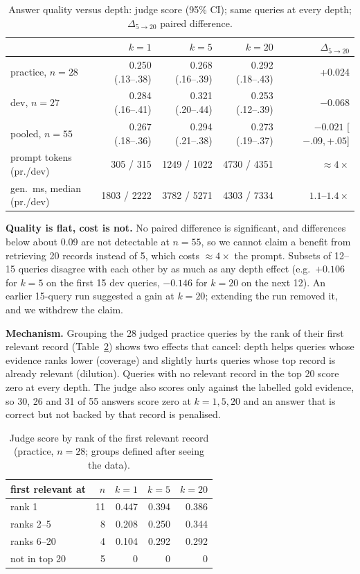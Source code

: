 \documentclass{article}
\begin{document}
\begin{table}[h]
\centering\footnotesize
\caption{Answer quality versus depth: judge score (95\% CI); same queries at every depth; $\Delta_{5\to20}$ paired difference.}
\label{tab:quality}
\begin{tabular}{lrrrr}
\toprule
 & $k{=}1$ & $k{=}5$ & $k{=}20$ & $\Delta_{5\to20}$\\
\midrule
practice, $n{=}28$ & 0.250 (.13--.38) & 0.268 (.16--.39) & 0.292 (.18--.43) & +0.024\\
dev, $n{=}27$ & 0.284 (.16--.41) & 0.321 (.20--.44) & 0.253 (.12--.39) & $-0.068$\\
pooled, $n{=}55$ & 0.267 (.18--.36) & 0.294 (.21--.38) & 0.273 (.19--.37) & $-0.021$ [$-.09,+.05$]\\
\midrule
prompt tokens (pr./dev) & 305 / 315 & 1249 / 1022 & 4730 / 4351 & $\approx4\times$\\
gen.\ ms, median (pr./dev) & 1803 / 2222 & 3782 / 5271 & 4303 / 7334 & $1.1$--$1.4\times$\\
\bottomrule
\end{tabular}
\end{table}

\textbf{Quality is flat, cost is not.} No paired difference is significant, and differences below about 0.09 are not detectable at $n{=}55$, so we cannot claim a benefit from retrieving 20 records instead of 5, which costs $\approx4\times$ the prompt. Subsets of 12--15 queries disagree with each other by as much as any depth effect (e.g.\ $+0.106$ for $k{=}5$ on the first 15 dev queries, $-0.146$ for $k{=}20$ on the next 12). An earlier 15-query run suggested a gain at $k{=}20$; extending the run removed it, and we withdrew the claim.

\textbf{Mechanism.} Grouping the 28 judged practice queries by the rank of their first relevant record (Table~\ref{tab:mech}) shows two effects that cancel: depth helps queries whose evidence ranks lower (coverage) and slightly hurts queries whose top record is already relevant (dilution). Queries with no relevant record in the top 20 score zero at every depth. The judge also scores only against the labelled gold evidence, so 30, 26 and 31 of 55 answers score zero at $k{=}1,5,20$ and an answer that is correct but not backed by that record is penalised.

\begin{table}[h]
\centering\small
\caption{Judge score by rank of the first relevant record (practice, $n{=}28$; groups defined after seeing the data).}
\label{tab:mech}
\begin{tabular}{lrrrr}
\toprule
first relevant at & $n$ & $k{=}1$ & $k{=}5$ & $k{=}20$\\
\midrule
rank 1 & 11 & 0.447 & 0.394 & 0.386\\
ranks 2--5 & 8 & 0.208 & 0.250 & 0.344\\
ranks 6--20 & 4 & 0.104 & 0.292 & 0.292\\
not in top 20 & 5 & 0 & 0 & 0\\
\bottomrule
\end{tabular}
\end{table}
\end{document}
